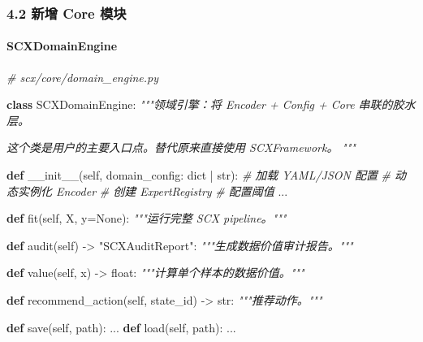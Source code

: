 \documentclass[
  12pt,
]{ctexart}
\newenvironment{Shaded}{}{}
\newcommand{\BuiltInTok}[1]{\textcolor[rgb]{0.00,0.50,0.00}{#1}}
\newcommand{\CommentTok}[1]{\textcolor[rgb]{0.38,0.63,0.69}{\textit{#1}}}
\newcommand{\FunctionTok}[1]{\textcolor[rgb]{0.02,0.16,0.49}{#1}}
\newcommand{\KeywordTok}[1]{\textcolor[rgb]{0.00,0.44,0.13}{\textbf{#1}}}
\newcommand{\NormalTok}[1]{#1}
\newcommand{\OperatorTok}[1]{\textcolor[rgb]{0.40,0.40,0.40}{#1}}
\newcommand{\StringTok}[1]{\textcolor[rgb]{0.25,0.44,0.63}{#1}}
\newcommand{\VariableTok}[1]{\textcolor[rgb]{0.10,0.09,0.49}{#1}}
\begin{document}
\subsubsection{4.2 新增 Core 模块}\label{ux65b0ux589e-core-ux6a21ux5757}

\paragraph{SCXDomainEngine}\label{scxdomainengine}

\begin{Shaded}
\begin{Highlighting}[]
\CommentTok{\# scx/core/domain\_engine.py}

\KeywordTok{class}\NormalTok{ SCXDomainEngine:}
    \CommentTok{"""领域引擎：将 Encoder + Config + Core 串联的胶水层。}

\CommentTok{    这个类是用户的主要入口点。替代原来直接使用 SCXFramework。}
\CommentTok{    """}

    \KeywordTok{def} \FunctionTok{\_\_init\_\_}\NormalTok{(}\VariableTok{self}\NormalTok{, domain\_config: }\BuiltInTok{dict} \OperatorTok{|} \BuiltInTok{str}\NormalTok{):}
        \CommentTok{\# 加载 YAML/JSON 配置}
        \CommentTok{\# 动态实例化 Encoder}
        \CommentTok{\# 创建 ExpertRegistry}
        \CommentTok{\# 配置阈值}
\NormalTok{        ...}

    \KeywordTok{def}\NormalTok{ fit(}\VariableTok{self}\NormalTok{, X, y}\OperatorTok{=}\VariableTok{None}\NormalTok{):}
        \CommentTok{"""运行完整 SCX pipeline。"""}

    \KeywordTok{def}\NormalTok{ audit(}\VariableTok{self}\NormalTok{) }\OperatorTok{{-}\textgreater{}} \StringTok{"SCXAuditReport"}\NormalTok{:}
        \CommentTok{"""生成数据价值审计报告。"""}

    \KeywordTok{def}\NormalTok{ value(}\VariableTok{self}\NormalTok{, x) }\OperatorTok{{-}\textgreater{}} \BuiltInTok{float}\NormalTok{:}
        \CommentTok{"""计算单个样本的数据价值。"""}

    \KeywordTok{def}\NormalTok{ recommend\_action(}\VariableTok{self}\NormalTok{, state\_id) }\OperatorTok{{-}\textgreater{}} \BuiltInTok{str}\NormalTok{:}
        \CommentTok{"""推荐动作。"""}

    \KeywordTok{def}\NormalTok{ save(}\VariableTok{self}\NormalTok{, path): ...}
    \KeywordTok{def}\NormalTok{ load(}\VariableTok{self}\NormalTok{, path): ...}
\end{Highlighting}
\end{Shaded}
\end{document}
